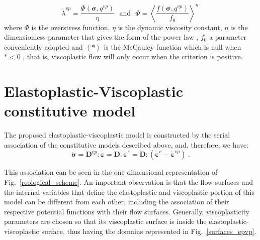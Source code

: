\documentclass[Journal,letterpaper]{ascelike-new}
\newcommand{\Dsdee}{\boldsymbol{D}}
\newcommand{\Dsdev}{\boldsymbol{D}^{vp}}
\newcommand{\dstraine}{\boldsymbol{\dot{\varepsilon}}^{e}}
\newcommand{\dstrainv}{\boldsymbol{\dot{\varepsilon}}^{vp}}
\newcommand{\dstrain}{\boldsymbol{\dot{\varepsilon}}}
\newcommand{\dstress}{\boldsymbol{\dot{\sigma}}}
\newcommand{\stress}{\boldsymbol{\sigma}}
\begin{document}
\begin{equation} \label{eq_perzyna_model}
	\dot \lambda^{vp} = \dfrac{\Phi(\stress,q^{vp})}{\eta}~~~\text{and}~~~\Phi = \left\langle  \dfrac{f(\stress,q^{vp})}{f_0} \right\rangle^n \,
\end{equation} where $\Phi$ is the overstress function, $\eta$ is the dynamic viscosity constant, $n$ is the dimensionless parameter that gives the form of the power law , $f_0$ a parameter conveniently adopted and $\left\langle * \right\rangle$ is the McCauley function which is null when $* <0$ , that is, viscoplastic flow will only occur when the criterion is positive.

\section{Elastoplastic-Viscoplastic constitutive model}

The proposed elastoplastic-viscoplastic model is constructed by the serial association of the constitutive models described above, and, therefore, we have:
\begin{equation} \label{eq_constitutive_relationship_plastic}
	\dstress = \Dsdev : \dstrain = \Dsdee : \dstraine = \Dsdee : (\dstraine - \dstrainv)\;.
\end{equation}

This association can be seen in the one-dimensional representation of Fig.~\ref{reological_scheme}. An important observation is that the flow surfaces and the internal variables that define the elastoplastic and viscoplastic portion of this model can be different from each other, including the association of their respective potential functions with their flow surfaces. Generally, viscoplasticity parameters are chosen so that its viscoplastic surface is inside the elastoplastic-viscoplastic surface, thus having the domains represented in Fig.~\ref{surfaces_epvp}.
\end{document}
